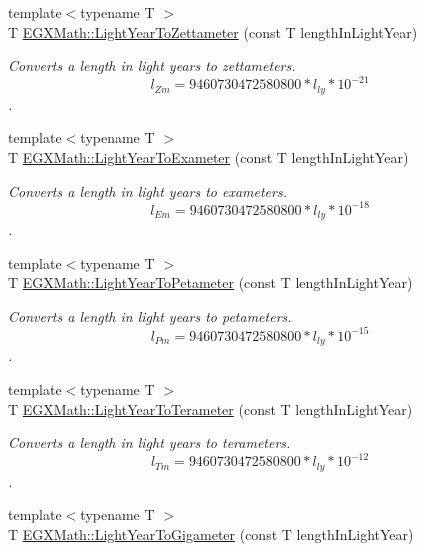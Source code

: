 \begin{DoxyCompactItemize}
{\footnotesize template$<$typename T $>$ }\\T \mbox{\hyperlink{group___e_g_x_math-_conversions-_length_conversions-_astronomical-_light_year-_s_i_gaa73b3b7d9806046fe0e8538c9e46a797}{E\+G\+X\+Math\+::\+Light\+Year\+To\+Zettameter}} (const T length\+In\+Light\+Year)
\begin{DoxyCompactList}\small\item\em Converts a length in light years to zettameters. \[ l_{Zm}=9460730472580800 * l_{ly} * 10^{-21} \]. \end{DoxyCompactList}\item 
{\footnotesize template$<$typename T $>$ }\\T \mbox{\hyperlink{group___e_g_x_math-_conversions-_length_conversions-_astronomical-_light_year-_s_i_gabba57c37044b3b96ab0d58e17dcbac80}{E\+G\+X\+Math\+::\+Light\+Year\+To\+Exameter}} (const T length\+In\+Light\+Year)
\begin{DoxyCompactList}\small\item\em Converts a length in light years to exameters. \[ l_{Em}=9460730472580800 * l_{ly} * 10^{-18} \]. \end{DoxyCompactList}\item 
{\footnotesize template$<$typename T $>$ }\\T \mbox{\hyperlink{group___e_g_x_math-_conversions-_length_conversions-_astronomical-_light_year-_s_i_ga23dfd2716086a8359b2231a3fad972e6}{E\+G\+X\+Math\+::\+Light\+Year\+To\+Petameter}} (const T length\+In\+Light\+Year)
\begin{DoxyCompactList}\small\item\em Converts a length in light years to petameters. \[ l_{Pm}=9460730472580800 * l_{ly} * 10^{-15} \]. \end{DoxyCompactList}\item 
{\footnotesize template$<$typename T $>$ }\\T \mbox{\hyperlink{group___e_g_x_math-_conversions-_length_conversions-_astronomical-_light_year-_s_i_ga0813df48068b4379915d32afbb142d28}{E\+G\+X\+Math\+::\+Light\+Year\+To\+Terameter}} (const T length\+In\+Light\+Year)
\begin{DoxyCompactList}\small\item\em Converts a length in light years to terameters. \[ l_{Tm}=9460730472580800 * l_{ly} * 10^{-12} \]. \end{DoxyCompactList}\item 
{\footnotesize template$<$typename T $>$ }\\T \mbox{\hyperlink{group___e_g_x_math-_conversions-_length_conversions-_astronomical-_light_year-_s_i_ga66a1da0c523d43d8e60c911e92703e97}{E\+G\+X\+Math\+::\+Light\+Year\+To\+Gigameter}} (const T length\+In\+Light\+Year)

\end{DoxyCompactItemize}

